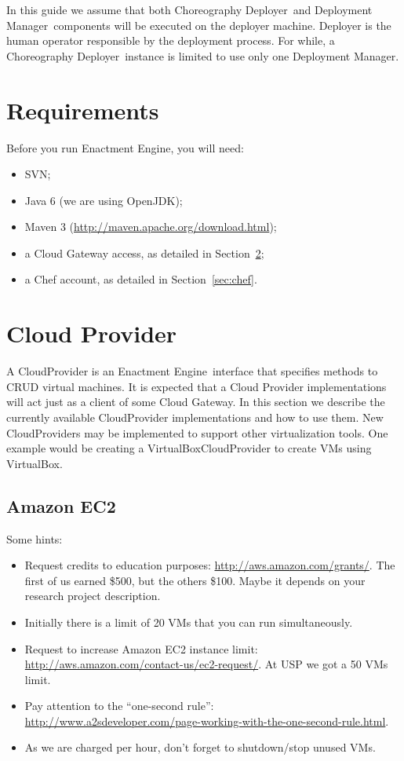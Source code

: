\documentclass[a4paper, 10pt]{article}
\newcommand{\ee}{Enactment Engine}
\newcommand{\cd}{Choreography Deployer}
\newcommand{\dm}{Deployment Manager}
\begin{document}
In this guide we assume that both \cd\ and \dm\ components will be executed on the deployer machine. Deployer is the human operator responsible by the deployment process. For while, a \cd\ instance is limited to use only one \dm.

\section{Requirements}

Before you run \ee, you will need:

\begin{itemize}
\item SVN;
\item Java 6 (we are using OpenJDK);
\item Maven 3  (\url{http://maven.apache.org/download.html});
\item a Cloud Gateway access, as detailed in Section~\ref{sec:cloud};
\item a Chef account, as detailed in Section~\ref{sec:chef}.
\end{itemize}

\section{Cloud Provider}
\label{sec:cloud}

A \textsf{CloudProvider} is an \ee\ interface that specifies methods to CRUD virtual machines. It is expected that a \textsf{Cloud Provider} implementations will act just as a client of some Cloud Gateway. In this section we describe the currently available \textsf{CloudProvider} implementations and how to use them. New \textsf{CloudProvider}s may be implemented to support other virtualization tools. One example would be creating a \textsf{VirtualBoxCloudProvider} to create VMs using VirtualBox.

\subsection{Amazon EC2}

Some hints:

\begin{itemize}
\item Request credits to education purposes: \url{http://aws.amazon.com/grants/}. The first of us earned \$500, but the others \$100. Maybe it depends on your research project description.
\item Initially there is a limit of 20 VMs that you can run simultaneously.
\item Request to increase Amazon EC2 instance limit: \url{http://aws.amazon.com/contact-us/ec2-request/}. At USP we got a 50 VMs limit.
\item Pay attention to the ``one-second rule'': \\ \url{http://www.a2sdeveloper.com/page-working-with-the-one-second-rule.html}.
\item As we are charged per hour, don't forget to shutdown/stop unused VMs.
\end{itemize}
\end{document}
